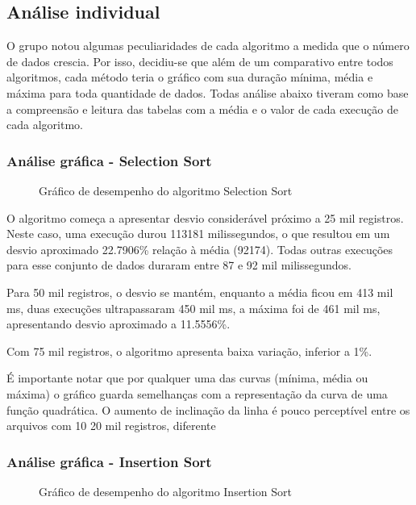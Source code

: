 \documentclass[a4paper,12pt]{scrartcl}
\begin{document}
\subsection{Análise individual}

O grupo notou algumas peculiaridades de cada algoritmo a medida que o número de dados crescia. Por isso, decidiu-se que além de um comparativo entre todos algoritmos, cada método teria o gráfico com sua duração mínima, média e máxima para toda quantidade de dados. Todas análise abaixo tiveram como base a compreensão e leitura das tabelas com a média e o valor de cada execução de cada algoritmo.

\subsubsection{Análise gráfica - Selection Sort}

\begin{figure}[H]
    \centering
    
    \caption{Gráfico de desempenho do algoritmo Selection Sort}
    \label{mapaSelect}
    
\end{figure}

O algoritmo começa a apresentar desvio considerável próximo a 25 mil registros. Neste caso, uma execução durou 113181 milissegundos, o que resultou em um desvio aproximado 22.7906\% relação à média (92174). Todas outras execuções para esse conjunto de dados duraram entre 87 e 92 mil milissegundos.

Para 50 mil registros, o desvio se mantém, enquanto a média ficou em 413 mil ms, duas execuções ultrapassaram 450 mil ms, a máxima foi de 461 mil ms, apresentando desvio aproximado a 11.5556\%. 

Com 75 mil registros, o algoritmo apresenta baixa variação, inferior a 1\%.

É importante notar que por qualquer uma das curvas (mínima, média ou máxima) o gráfico guarda semelhanças com a representação da curva de uma função quadrática. O aumento de inclinação da linha é pouco perceptível entre os arquivos com 10 20 mil registros, diferente 

\subsubsection{Análise gráfica - Insertion Sort}

\begin{figure}[H]
    \centering
    
    \caption{Gráfico de desempenho do algoritmo Insertion Sort}
    \label{mapaSelect}
\end{figure}
\end{document}
